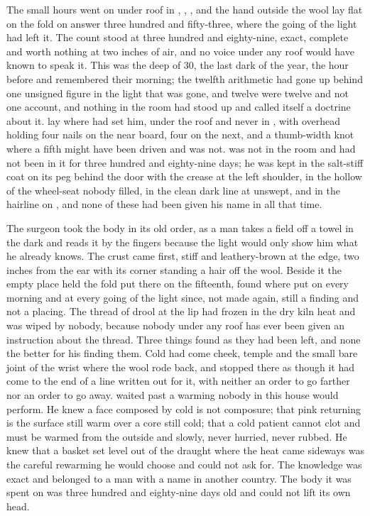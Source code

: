 The small hours went on under  roof in , , , and the hand outside the wool lay flat on the fold on answer three hundred and fifty-three, where the going of the light had left it. The count stood at three hundred and eighty-nine, exact, complete and worth nothing at two inches of air, and no voice under any roof would have known to speak it. This was the deep of  30, the last dark of the year, the hour before  and  remembered their morning; the twelfth arithmetic had gone up behind one unsigned figure in the light that was gone, and twelve were twelve and not one account, and nothing in the room had stood up and called itself a doctrine about it.  lay where  had set him, under the roof and never in , with  overhead holding four nails on the near board, four on the next, and a thumb-width knot where a fifth might have been driven and was not.  was not in the room and had not been in it for three hundred and eighty-nine days; he was kept in the salt-stiff coat on its peg behind the door with the crease at the left shoulder, in the hollow of the wheel-seat nobody filled, in the clean dark line at  unswept, and in the hairline on , and none of these had been given his name in all that time.

The surgeon took the body in its old order, as a man takes a field off a towel in the dark and reads it by the fingers because the light would only show him what he already knows. The crust came first, stiff and leathery-brown at the edge, two inches from the ear with its corner standing a hair off the wool. Beside it the empty place held the fold put there on the fifteenth, found where put on every morning and at every going of the light since, not made again, still a finding and not a placing. The thread of drool at the lip had frozen in the dry kiln heat and was wiped by nobody, because nobody under any roof has ever been given an instruction about the thread. Three things found as they had been left, and none the better for his finding them. Cold had come cheek, temple and the small bare joint of the wrist where the wool rode back, and stopped there as though it had come to the end of a line written out for it, with neither an order to go farther nor an order to go away.  waited past a warming nobody in this house would perform. He knew a face composed by cold is not composure; that pink returning is the surface still warm over a core still cold; that a cold patient cannot clot and must be warmed from the outside and slowly, never hurried, never rubbed. He knew that a basket set level out of the draught where the heat came sideways was the careful rewarming he would choose and could not ask for. The knowledge was exact and belonged to a man with a name in another country. The body it was spent on was three hundred and eighty-nine days old and could not lift its own head.

